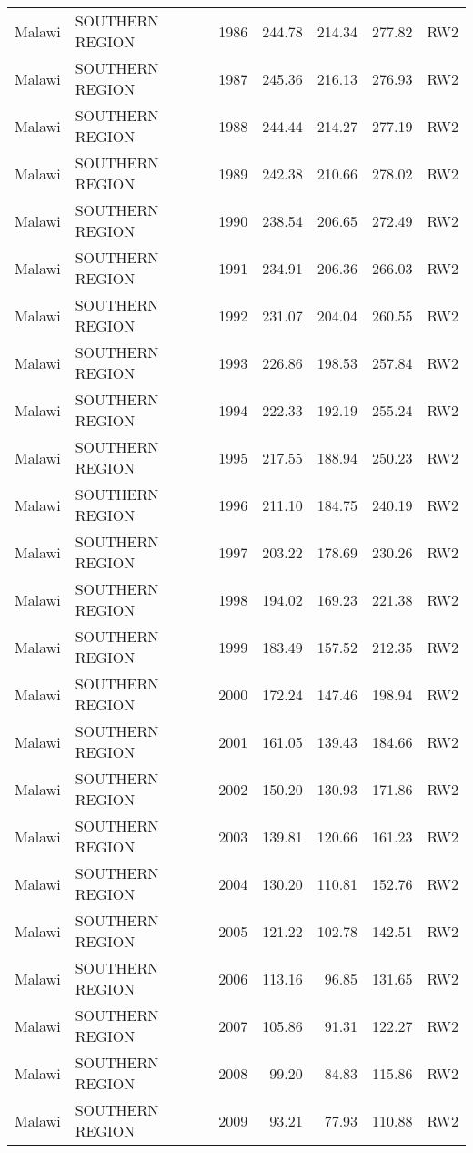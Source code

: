 \begin{longtable}{lllrrrl}
  Malawi & SOUTHERN REGION & 1986 & 244.78 & 214.34 & 277.82 & RW2 \\ 
  Malawi & SOUTHERN REGION & 1987 & 245.36 & 216.13 & 276.93 & RW2 \\ 
  Malawi & SOUTHERN REGION & 1988 & 244.44 & 214.27 & 277.19 & RW2 \\ 
  Malawi & SOUTHERN REGION & 1989 & 242.38 & 210.66 & 278.02 & RW2 \\ 
  Malawi & SOUTHERN REGION & 1990 & 238.54 & 206.65 & 272.49 & RW2 \\ 
  Malawi & SOUTHERN REGION & 1991 & 234.91 & 206.36 & 266.03 & RW2 \\ 
  Malawi & SOUTHERN REGION & 1992 & 231.07 & 204.04 & 260.55 & RW2 \\ 
  Malawi & SOUTHERN REGION & 1993 & 226.86 & 198.53 & 257.84 & RW2 \\ 
  Malawi & SOUTHERN REGION & 1994 & 222.33 & 192.19 & 255.24 & RW2 \\ 
  Malawi & SOUTHERN REGION & 1995 & 217.55 & 188.94 & 250.23 & RW2 \\ 
  Malawi & SOUTHERN REGION & 1996 & 211.10 & 184.75 & 240.19 & RW2 \\ 
  Malawi & SOUTHERN REGION & 1997 & 203.22 & 178.69 & 230.26 & RW2 \\ 
  Malawi & SOUTHERN REGION & 1998 & 194.02 & 169.23 & 221.38 & RW2 \\ 
  Malawi & SOUTHERN REGION & 1999 & 183.49 & 157.52 & 212.35 & RW2 \\ 
  Malawi & SOUTHERN REGION & 2000 & 172.24 & 147.46 & 198.94 & RW2 \\ 
  Malawi & SOUTHERN REGION & 2001 & 161.05 & 139.43 & 184.66 & RW2 \\ 
  Malawi & SOUTHERN REGION & 2002 & 150.20 & 130.93 & 171.86 & RW2 \\ 
  Malawi & SOUTHERN REGION & 2003 & 139.81 & 120.66 & 161.23 & RW2 \\ 
  Malawi & SOUTHERN REGION & 2004 & 130.20 & 110.81 & 152.76 & RW2 \\ 
  Malawi & SOUTHERN REGION & 2005 & 121.22 & 102.78 & 142.51 & RW2 \\ 
  Malawi & SOUTHERN REGION & 2006 & 113.16 & 96.85 & 131.65 & RW2 \\ 
  Malawi & SOUTHERN REGION & 2007 & 105.86 & 91.31 & 122.27 & RW2 \\ 
  Malawi & SOUTHERN REGION & 2008 & 99.20 & 84.83 & 115.86 & RW2 \\ 
  Malawi & SOUTHERN REGION & 2009 & 93.21 & 77.93 & 110.88 & RW2 \\ 

\end{longtable}
